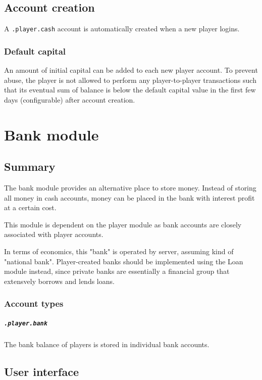 \documentclass{report}
\begin{document}
		\section{Account creation}
			A \texttt{.player.cash} account is automatically created when a new player logins.

			\subsection{Default capital}
				An amount of initial capital can be added to each new player account.
				To prevent abuse, the player is not allowed to perform any player-to-player transactions
				such that its eventual sum of balance is below the default capital value
				in the first few days (configurable) after account creation.

	\chapter{Bank module}
		\section{Summary}
			The bank module provides an alternative place to store money.
			Instead of storing all money in cash accounts, money can be placed in the bank with interest profit at a certain cost.

			This module is dependent on the player module as bank accounts are closely associated with player accounts.

			In terms of economics, this "bank" is operated by server, assuming kind of "national bank".
			Player-created banks should be implemented using the Loan module instead,
			since private banks are essentially a financial group that extensvely borrows and lends loans.

			\subsection{Account types}
				\paragraph{\texttt{.player.bank}}
					The bank balance of players is stored in individual bank accounts.

		\section{User interface}
\end{document}
